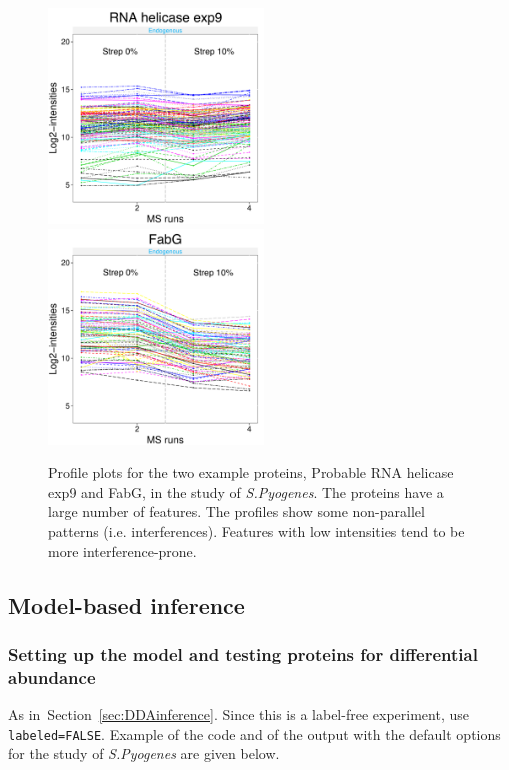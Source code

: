 \documentclass[11pt]{article}
\def\secref#1{Section~\ref{sec:#1}}
\begin{document}
\begin{figure}[h!]
\begin{center}
\includegraphics[width=2.25in]{DIA_ProfilePlot_269.pdf}
\includegraphics[width=2.25in]{DIA_ProfilePlot_377.pdf}
\vspace{-0.3cm}
\caption{\small Profile plots for the two example proteins, Probable RNA helicase exp9 and FabG, in the study of {\it S.Pyogenes}. The proteins have a large number of features. The profiles show some non-parallel patterns (i.e. interferences). Features with low intensities tend to be more interference-prone. \label{fig:DIAprofile}}
\end{center}
\end{figure}


\subsection{Model-based inference}

\subsubsection{Setting up the model and testing proteins for differential abundance}

As in~\secref{DDAinference}. Since this is a label-free experiment, use {\tt labeled=FALSE}. Example of the code and of the output with the default options for the study of {\it S.Pyogenes} are given below. 
\end{document}
